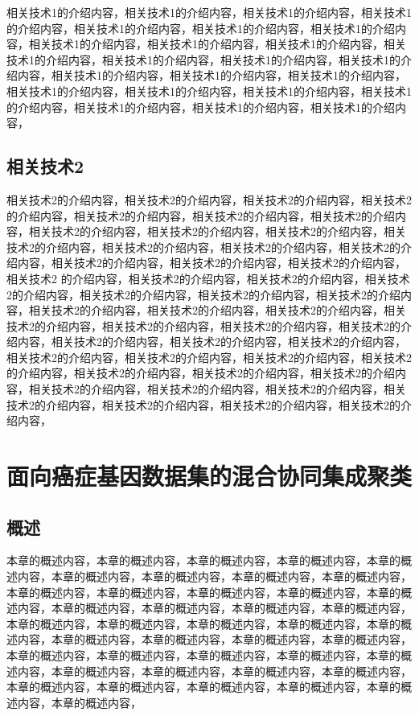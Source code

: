 \documentclass[unicode,pdfcover]{hquthesis}
\begin{document}
相关技术1的介绍内容，相关技术1的介绍内容，相关技术1的介绍内容，相关技术1的介绍内容，相关技术1的介绍内容，相关技术1的介绍内容，相关技术1的介绍内容，相关技术1的介绍内容，相关技术1的介绍内容，相关技术1的介绍内容，相关技术1的介绍内容，相关技术1的介绍内容，相关技术1的介绍内容，相关技术1的介绍内容，相关技术1的介绍内容，相关技术1的介绍内容，相关技术1的介绍内容，相关技术1的介绍内容，相关技术1的介绍内容，相关技术1的介绍内容，相关技术1的介绍内容，相关技术1的介绍内容，相关技术1的介绍内容，相关技术1的介绍内容，


\section{相关技术2}

相关技术2的介绍内容，相关技术2的介绍内容，相关技术2的介绍内容，相关技术2的介绍内容，相关技术2的介绍内容，相关技术2的介绍内容，相关技术2的介绍内容，相关技术2的介绍内容，相关技术2的介绍内容，相关技术2的介绍内容，相关技术2的介绍内容，相关技术2的介绍内容，相关技术2的介绍内容，相关技术2的介绍内容，相关技术2的介绍内容，相关技术2的介绍内容，相关技术2的介绍内容，相关技术2 的介绍内容，相关技术2的介绍内容，相关技术2的介绍内容，相关技术2的介绍内容，相关技术2的介绍内容，相关技术2的介绍内容，相关技术2的介绍内容，相关技术2的介绍内容，相关技术2的介绍内容，相关技术2的介绍内容，相关技术2的介绍内容，相关技术2的介绍内容，相关技术2的介绍内容，相关技术2的介绍内容，相关技术2的介绍内容，相关技术2的介绍内容，相关技术2的介绍内容，相关技术2的介绍内容，相关技术2的介绍内容，相关技术2的介绍内容，相关技术2的介绍内容，相关技术2的介绍内容，相关技术2的介绍内容，相关技术2的介绍内容，相关技术2的介绍内容，相关技术2的介绍内容，相关技术2的介绍内容，相关技术2的介绍内容，相关技术2的介绍内容，相关技术2的介绍内容，相关技术2的介绍内容，




\chapter{面向癌症基因数据集的混合协同集成聚类}

\section{概述}
本章的概述内容，本章的概述内容，本章的概述内容，本章的概述内容，本章的概述内容，本章的概述内容，本章的概述内容，本章的概述内容，本章的概述内容，本章的概述内容，本章的概述内容，本章的概述内容，本章的概述内容，本章的概述内容，本章的概述内容，本章的概述内容，本章的概述内容，本章的概述内容，本章的概述内容，本章的概述内容，本章的概述内容，本章的概述内容，本章的概述内容，本章的概述内容，本章的概述内容，本章的概述内容，本章的概述内容，本章的概述内容，本章的概述内容，本章的概述内容，本章的概述内容，本章的概述内容，本章的概述内容，本章的概述内容，本章的概述内容，本章的概述内容，本章的概述内容，本章的概述内容，本章的概述内容，本章的概述内容，本章的概述内容，本章的概述内容，
\end{document}
